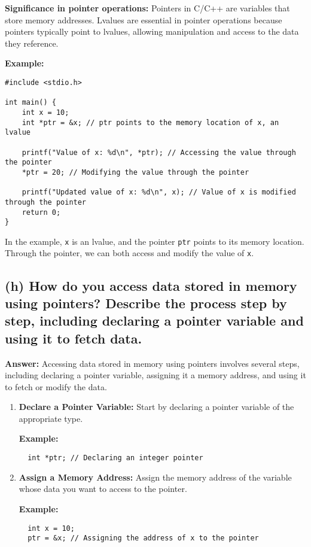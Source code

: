 \documentclass{article}
\begin{document}
\begin{enumerate}
\textbf{Significance in pointer operations:}
Pointers in C/C++ are variables that store memory addresses. Lvalues are essential in pointer operations because pointers typically point to lvalues, allowing manipulation and access to the data they reference.

\textbf{Example:}
\begin{verbatim}
#include <stdio.h>

int main() {
    int x = 10;
    int *ptr = &x; // ptr points to the memory location of x, an lvalue

    printf("Value of x: %d\n", *ptr); // Accessing the value through the pointer
    *ptr = 20; // Modifying the value through the pointer

    printf("Updated value of x: %d\n", x); // Value of x is modified through the pointer
    return 0;
}
\end{verbatim}

In the example, \texttt{x} is an lvalue, and the pointer \texttt{ptr} points to its memory location. Through the pointer, we can both access and modify the value of \texttt{x}.
\subsection*{(h) How do you access data stored in memory using pointers? Describe the process step by step, including declaring a pointer variable and using it to fetch data.}

\textbf{Answer:} Accessing data stored in memory using pointers involves several steps, including declaring a pointer variable, assigning it a memory address, and using it to fetch or modify the data.

\begin{enumerate}
  \item \textbf{Declare a Pointer Variable:} Start by declaring a pointer variable of the appropriate type.

  \textbf{Example:}
  \begin{verbatim}
  int *ptr; // Declaring an integer pointer
  \end{verbatim}

  \item \textbf{Assign a Memory Address:} Assign the memory address of the variable whose data you want to access to the pointer.

  \textbf{Example:}
  \begin{verbatim}
  int x = 10;
  ptr = &x; // Assigning the address of x to the pointer
  \end{verbatim}


\end{enumerate}
\end{enumerate}
\end{document}
